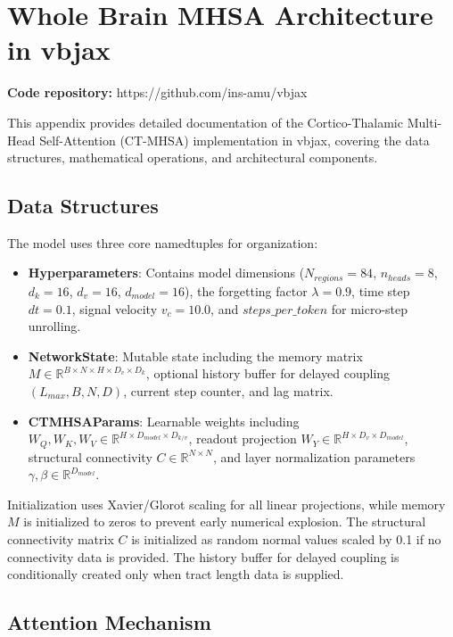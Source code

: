 \section{Whole Brain MHSA Architecture in vbjax}\label{sec:mhsa-appendix}

\textbf{Code repository:} https://github.com/ins-amu/vbjax

This appendix provides detailed documentation of the Cortico-Thalamic Multi-Head Self-Attention (CT-MHSA) implementation in vbjax, covering the data structures, mathematical operations, and architectural components.

\subsection{Data Structures}

The model uses three core namedtuples for organization:

\begin{itemize}
	\item \textbf{Hyperparameters}: Contains model dimensions ($N_{regions}=84$, $n_{heads}=8$, $d_k=16$, $d_v=16$, $d_{model}=16$), the forgetting factor $\lambda=0.9$, time step $dt=0.1$, signal velocity $v_c=10.0$, and $steps\_per\_token$ for micro-step unrolling.
	\item \textbf{NetworkState}: Mutable state including the memory matrix $M \in \mathbb{R}^{B \times N \times H \times D_v \times D_k}$, optional history buffer for delayed coupling $(L_{max}, B, N, D)$, current step counter, and lag matrix.
	\item \textbf{CTMHSAParams}: Learnable weights including $W_Q, W_K, W_V \in \mathbb{R}^{H \times D_{model} \times D_{k/v}}$, readout projection $W_Y \in \mathbb{R}^{H \times D_v \times D_{model}}$, structural connectivity $C \in \mathbb{R}^{N \times N}$, and layer normalization parameters $\gamma, \beta \in \mathbb{R}^{D_{model}}$.
\end{itemize}

Initialization uses Xavier/Glorot scaling for all linear projections, while memory $M$ is initialized to zeros to prevent early numerical explosion. The structural connectivity matrix $C$ is initialized as random normal values scaled by 0.1 if no connectivity data is provided. The history buffer for delayed coupling is conditionally created only when tract length data is supplied.

\subsection{Attention Mechanism}


